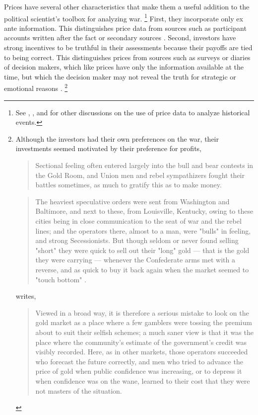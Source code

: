 Prices have several other characteristics that make them a useful addition to the political scientist's toolbox for analyzing war.
\footnote{See \textcite{WillardGuinnaneEtAl1996}, \textcite{north2000introd}, and \textcite{FreyKucher2000} for other  discussions on the use of price data to analyze historical events.} %
First, they incorporate only ex ante information. This distinguishes price data from sources such as participant accounts written after the fact or secondary sources \parencites[1001]{WillardGuinnaneEtAl1996}[][188]{FreyKucher2000a}.
Second, investors have strong incentives to be truthful in their assessments because their payoffs are tied to being correct.
This distinguishes prices from sources such as surveys or diaries of decision makers, which like prices have only the information available at the time, but which the decision maker may not reveal the truth for strategic or emotional reasons \parencite[57]{Reiter2009}.%
\footnote{Although the investors had their own preferences on the war,
  their investments seemed motivated by their preference for profits,
  \begin{quote}
    Sectional feeling often entered largely into the bull and bear
    contests in the Gold Room, and Union men and rebel sympathizers fought
    their battles sometimes, as much to gratify this as to make money.
    \textcite[7]{Cornwallis1879}
  \end{quote}
  \begin{quote}
    The heaviest speculative orders were sent from Washington and
    Baltimore, and next to these, from Louisville, Kentucky, owing to
    these cities being in close communication to the seat of war and the
    rebel lines; and the operators there, almost to a man, were "bulls"
    in feeling, and strong Secessionists.  But though seldom or never
    found selling "short" they were quick to sell out their "long" gold
    --- that is the gold they were carrying --- whenever the Confederate
    arms met with a reverse, and as quick to buy it back again when the
    market seemed to "touch bottom" \textcite[5]{Cornwallis1879}.
  \end{quote}
  \textcite[210]{Mitchell1903} writes,
  \begin{quote}
    Viewed in a broad way, it is therefore a serious
    mistake to look on the gold market as a place where a few gamblers
    were tossing the premium about to suit their selfish schemes; a much
    saner view is that it was the place where the community's estimate
    of the government's credit was visibly recorded. Here, as in other
    markets, those operators succeeded who forecast the future
    correctly, and men who tried to advance the price of gold when
    public confidence was increasing, or to depress it when confidence
    was on the wane, learned to their cost that they were not masters of
    the situation.
  \end{quote}
} %
